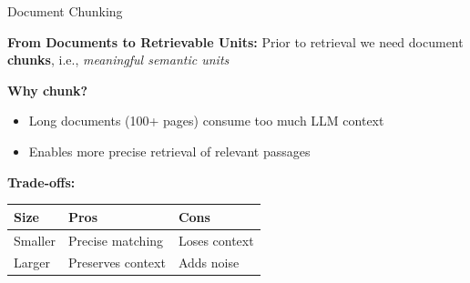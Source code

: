 \documentclass[11pt,compress,t,notes=noshow, xcolor=table]{beamer}
\begin{document}

\begin{frame}{Document Chunking}

\vfill

\textbf{From Documents to Retrievable Units:} Prior to retrieval we need document \textbf{chunks}, i.e., \textit{meaningful semantic units}\\ 

\vspace{1em}

 \textbf{Why chunk?}
 \begin{itemize}
     \item Long documents (100+ pages) consume too much LLM context
     \item Enables more precise retrieval of relevant passages
 \end{itemize}

\vspace{1em}

 \textbf{Trade-offs:}
 \begin{center}
 \small
 \begin{tabular}{lll}
 \toprule
 \textbf{Size} & \textbf{Pros} & \textbf{Cons}  \\
 \midrule
 Smaller & Precise matching & Loses context  \\
 Larger & Preserves context & Adds noise  \\
 \bottomrule
 \end{tabular}
 \end{center}

 \vfill

\end{frame}

\end{document}
